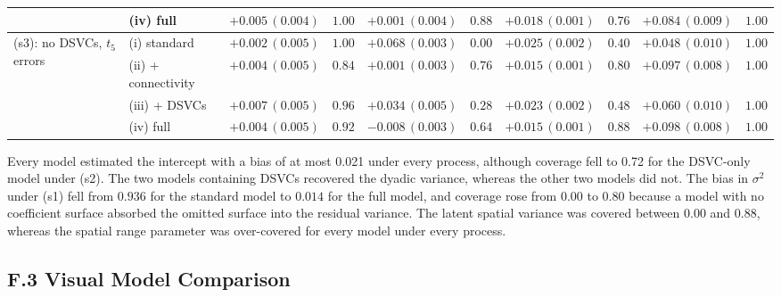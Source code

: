 \documentclass{article}
\begin{document}
\begin{table}[h]
{\begin{tabular}{llcccccccc}
    & (iv) full & $\mathbf{+0.005}\,(0.004)$ & $1.00$ & $\mathbf{+0.001}\,(0.004)$ & $0.88$ & $\mathbf{+0.018}\,(0.001)$ & $0.76$ & $+0.084\,(0.009)$ & $1.00$ \\
\midrule
\multirow{4}{*}{(s3): no DSVCs, $t_5$ errors}
    & (i) standard & $\mathbf{+0.002}\,(0.005)$ & $1.00$ & $+0.068\,(0.003)$ & $0.00$ & $+0.025\,(0.002)$ & $0.40$ & $\mathbf{+0.048}\,(0.010)$ & $1.00$ \\
    & (ii) + connectivity & $+0.004\,(0.005)$ & $0.84$ & $\mathbf{+0.001}\,(0.003)$ & $0.76$ & $\mathbf{+0.015}\,(0.001)$ & $0.80$ & $+0.097\,(0.008)$ & $1.00$ \\
    & (iii) + DSVCs & $+0.007\,(0.005)$ & $0.96$ & $+0.034\,(0.005)$ & $0.28$ & $+0.023\,(0.002)$ & $0.48$ & $+0.060\,(0.010)$ & $1.00$ \\
    & (iv) full & $+0.004\,(0.005)$ & $0.92$ & $-0.008\,(0.003)$ & $0.64$ & $\mathbf{+0.015}\,(0.001)$ & $0.88$ & $+0.098\,(0.008)$ & $1.00$ \\
\bottomrule
\end{tabular}}
\end{table}
 
Every model estimated the intercept with a bias of at most 0.021 under every process, although coverage fell to 0.72 for the DSVC-only model under (s2). The two models
containing DSVCs recovered the dyadic variance, whereas the other two models did not. The bias in $\sigma^2$ under (s1) fell from $0.936$ for the standard model
to $0.014$ for the full model, and coverage rose from $0.00$ to $0.80$ because
a model with no coefficient surface absorbed the omitted surface into the
residual variance. The latent spatial variance was covered between $0.00$ and $0.88$, whereas the spatial
range parameter was over-covered for every model under every process.

\subsection*{F.3 Visual Model Comparison}
\end{document}

